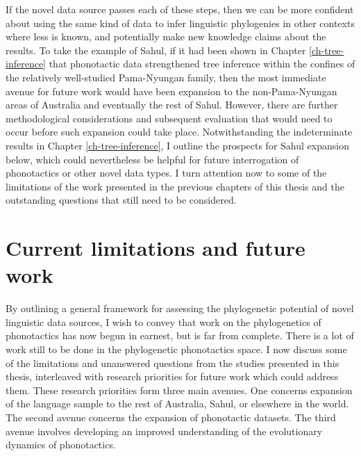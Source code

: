 If the novel data source passes each of these steps, then we can be more confident about using the same kind of data to infer linguistic phylogenies in other contexts where less is known, and potentially make new knowledge claims about the results. To take the example of Sahul, if it had been shown in Chapter \ref{ch-tree-inference} that phonotactic data strengthened tree inference within the confines of the relatively well-studied Pama-Nyungan family, then the most immediate avenue for future work would have been expansion to the non-Pama-Nyungan areas of Australia and eventually the rest of Sahul. However, there are further methodological considerations and subsequent evaluation that would need to occur before such expansion could take place. Notwithstanding the indeterminate results in Chapter \ref{ch-tree-inference}, I outline the prospects for Sahul expansion below, which could nevertheless be helpful for future interrogation of phonotactics or other novel data types. I turn attention now to some of the limitations of the work presented in the previous chapters of this thesis and the outstanding questions that still need to be considered.

\hypertarget{current-limitations-and-future-work}{%
\section{Current limitations and future work}\label{current-limitations-and-future-work}}

By outlining a general framework for assessing the phylogenetic potential of novel linguistic data sources, I wish to convey that work on the phylogenetics of phonotactics has now begun in earnest, but is far from complete. There is a lot of work still to be done in the phylogenetic phonotactics space. I now discuss some of the limitations and unanswered questions from the studies presented in this thesis, interleaved with research priorities for future work which could address them. These research priorities form three main avenues. One concerns expansion of the language sample to the rest of Australia, Sahul, or elsewhere in the world. The second avenue concerns the expansion of phonotactic datasets. The third avenue involves developing an improved understanding of the evolutionary dynamics of phonotactics.

